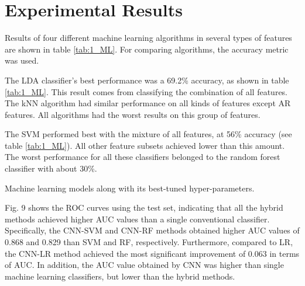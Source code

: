 


 

\section{Experimental Results}

Results of four different machine learning algorithms in several types of features are shown in table \ref{tab:1_ML}. For comparing algorithms, the accuracy metric was used. 
 
The LDA classifier’s best performance was a 69.2\% accuracy, as shown in table \ref{tab:1_ML}. This result comes from classifying the combination of all features. 
The kNN algorithm had similar performance on all kinds of features except \gls{AR} features. All algorithms had the worst results on this group of features.

The SVM performed best with the mixture of all features, at 56\% accuracy (see table \ref{tab:1_ML}). All other feature subsets achieved lower than this amount. The worst performance for all these classifiers belonged to the random forest classifier with about 30\%.

\begin{center}
	\begin{table*}[!t]
	\caption{Machine learning models along with its best-tuned hyper-parameters.}
	\label{tab:1_ML}
	\hspace{-1em}
	
	\end{table*}
\end{center}



Fig. 9 shows the ROC curves using the test set, indicating that all the hybrid methods achieved higher AUC values than a single conventional classifier. Specifically, the CNN-SVM and CNN-RF methods obtained higher AUC values of 0.868 and 0.829 than SVM and RF, respectively. Furthermore, compared to LR, the CNN-LR method achieved the most significant improvement of 0.063 in terms of AUC. In addition, the AUC value obtained by CNN was higher than single machine learning classifiers, but lower than the hybrid methods. 
